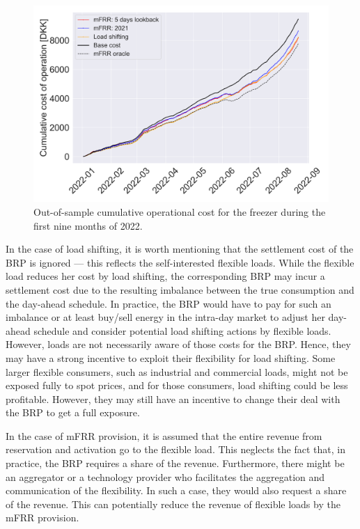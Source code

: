 \documentclass[11pt,a4paper]{article}
\begin{document}
\begin{figure}[t]
    \centering
    \includegraphics[width=\columnwidth]{figures/cumulative_cost_comparison.png}
    \caption{Out-of-sample cumulative operational cost for the freezer during the first nine months of 2022.}
    \label{fig:cumulative_cost_comparison}
\end{figure}

In the case of load shifting, it is worth mentioning that the settlement cost of the BRP is ignored --- this reflects the self-interested flexible loads.  While the flexible load reduces her cost by load shifting, the corresponding BRP may incur a settlement cost due to the resulting imbalance between the true consumption and the day-ahead schedule. In practice, the BRP would have to pay for such an imbalance or at least buy/sell energy in the intra-day market to adjust her day-ahead schedule and consider potential load shifting actions by flexible loads. However, loads are not necessarily aware of those costs for the BRP. Hence, they may have a strong incentive to exploit their flexibility for load shifting. Some larger flexible consumers, such as industrial and commercial loads, might not be exposed fully to spot prices, and for those consumers, load shifting could be less profitable. However, they may still have an incentive to change their deal with the BRP to get a full exposure.

In the case of mFRR  provision, it is   assumed that the entire revenue from reservation and activation go to the flexible load. This neglects the fact that, in practice, the BRP requires a share of the revenue. Furthermore, there might be an aggregator or a technology provider who facilitates the aggregation and communication of the flexibility. In such a case, they would also request a share of the revenue. This can potentially reduce the revenue of flexible loads by the mFRR provision.
\end{document}
